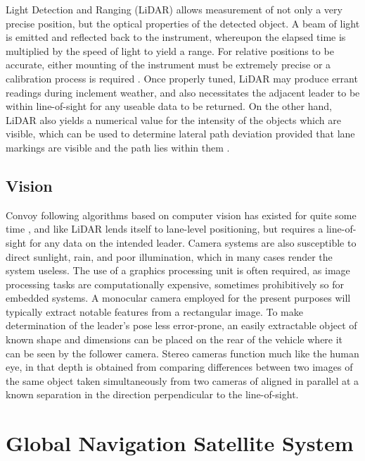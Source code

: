 \documentclass[12pt]{report}
\begin{document}
Light Detection and Ranging (LiDAR) allows measurement of not only a very precise position, but the optical properties of the detected object. A beam of light is emitted and reflected back to the instrument, whereupon the elapsed time is multiplied by the speed of light to yield a range. For relative positions to be accurate, either mounting of the instrument must be extremely precise or a calibration process is required \cite{jordanlidar}. Once properly tuned, LiDAR may produce errant readings during inclement weather, and also necessitates the adjacent leader to be within line-of-sight for any useable data to be returned. On the other hand, LiDAR also yields a numerical value for the intensity of the objects which are visible, which can be used to determine lateral path deviation provided that lane markings are visible and the path lies within them \cite{cameralidarlane}. 

\subsection{Vision}
Convoy following algorithms based on computer vision has existed for quite some time \cite{visionrec}, and like LiDAR lends itself to lane-level positioning, but requires a line-of-sight for any data on the intended leader. Camera systems are also susceptible to direct sunlight, rain, and poor illumination, which in many cases render the system useless. The use of a graphics processing unit is often required, as image processing tasks are computationally expensive, sometimes prohibitively so for embedded systems.
A monocular camera employed for the present purposes will typically extract notable features from a rectangular image. To make determination of the leader's pose less error-prone, an easily extractable object of known shape and dimensions can be placed on the rear of the vehicle where it can be seen by the follower camera.
Stereo cameras function much like the human eye, in that depth is obtained from comparing differences between two images of the same object taken simultaneously from two cameras of aligned in parallel at a known separation in the direction perpendicular to the line-of-sight.


\section{Global Navigation Satellite System}
\end{document}
